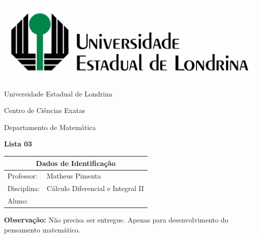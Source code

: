 \documentclass[oneside,a4paper,12pt]{article}
\newcommand{\universidade}{Universidade Estadual de Londrina}
\newcommand{\centro}{Centro de Ciências Exatas}
\newcommand{\departamento}{Departamento de Matemática}
\newcommand{\curso}{Ciência da Computação}
\newcommand{\professores}{Matheus Pimenta}
\newcommand{\disciplina}{Cálculo Diferencial e Integral II}
\begin{document}
	\pagestyle{empty}
	
	\begin{center}
		\includegraphics[width=\linewidth/2]{logo.jpg}%
	 	\vspace{2pt} 	
		
		\universidade
		\par
		\centro
		\par
		\departamento
		\par
		\par
		\vspace{12pt}
		\LARGE \textbf{Lista 03}
		
	\end{center}
	
	\vspace{12pt}
	
	\begin{tabular}{ |l|p{12cm}| }
		
		\hline
		\multicolumn{2}{|c|}{\textbf{Dados de Identificação}} \\
		\hline
		Professor:         &    \professores           \\
		\hline
		Disciplina:        &    \disciplina          \\
		\hline
		Aluno:             &                   \\
		\hline
		
	\end{tabular}
	\vspace{6pt}
	
	{\bf Observação:} Não precisa ser entregue. Apenas para desenvolvimento do pensamento matemático.
	
	\begin{snugshade}
	\end{snugshade}
\end{document}
